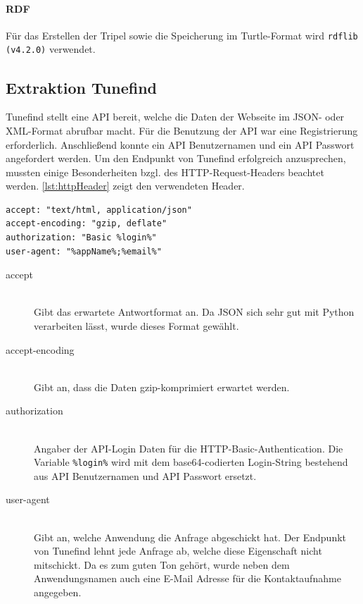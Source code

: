 \documentclass[parskip]{scrartcl}
\begin{document}
\paragraph{RDF}
Für das Erstellen der Tripel sowie die Speicherung im Turtle-Format wird \texttt{rdflib (v4.2.0)} verwendet. 

\subsection{Extraktion Tunefind}

Tunefind stellt eine API bereit, welche die Daten der Webseite im JSON- oder XML-Format abrufbar macht. Für die Benutzung der API war eine Registrierung erforderlich. Anschließend konnte ein API Benutzernamen und ein API Passwort angefordert werden.
Um den Endpunkt von Tunefind erfolgreich anzusprechen, mussten einige Besonderheiten bzgl. des HTTP-Request-Headers beachtet werden. \autoref{lst:httpHeader} zeigt den verwendeten Header.

\begin{lstlisting}[caption={HTTP-Request-Header}, label={lst:httpHeader}]
accept: "text/html, application/json"
accept-encoding: "gzip, deflate"
authorization: "Basic %login%"
user-agent: "%appName%;%email%"
\end{lstlisting}

\begin{description}
    \item[accept] \hfill \\
        Gibt das erwartete Antwortformat an. Da JSON sich sehr gut mit Python verarbeiten lässt, wurde dieses Format gewählt.
    \item[accept-encoding] \hfill \\
        Gibt an, dass die Daten gzip-komprimiert erwartet werden.
    \item[authorization] \hfill \\
        Angaber der API-Login Daten für die HTTP-Basic-Authentication.
        Die Variable \texttt{\%login\%} wird mit dem base64-codierten Login-String bestehend aus API Benutzernamen und API Passwort ersetzt.
    \item[user-agent] \hfill \\
        Gibt an, welche Anwendung die Anfrage abgeschickt hat. Der Endpunkt von Tunefind lehnt jede Anfrage ab, welche diese Eigenschaft nicht mitschickt. Da es zum guten Ton gehört, wurde neben dem Anwendungsnamen auch eine E-Mail Adresse für die Kontaktaufnahme angegeben.
\end{description}
\end{document}
